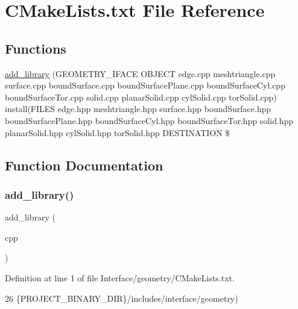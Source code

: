 \hypertarget{Interface_2geometry_2CMakeLists_8txt}{}\section{C\+Make\+Lists.\+txt File Reference}
\label{Interface_2geometry_2CMakeLists_8txt}
\subsection*{Functions}
\begin{DoxyCompactItemize}
\item 
\hyperlink{Interface_2geometry_2CMakeLists_8txt_a7893921b833d447c74d8d3f27995e8a1}{add\+\_\+library} (G\+E\+O\+M\+E\+T\+R\+Y\+\_\+\+I\+F\+A\+CE O\+B\+J\+E\+CT edge.\+cpp meshtriangle.\+cpp surface.\+cpp bound\+Surface.\+cpp bound\+Surface\+Plane.\+cpp bound\+Surface\+Cyl.\+cpp bound\+Surface\+Tor.\+cpp solid.\+cpp planar\+Solid.\+cpp cyl\+Solid.\+cpp tor\+Solid.\+cpp) install(F\+I\+L\+ES edge.\+hpp meshtriangle.\+hpp surface.\+hpp bound\+Surface.\+hpp bound\+Surface\+Plane.\+hpp bound\+Surface\+Cyl.\+hpp bound\+Surface\+Tor.\+hpp solid.\+hpp planar\+Solid.\+hpp cyl\+Solid.\+hpp tor\+Solid.\+hpp D\+E\+S\+T\+I\+N\+A\+T\+I\+ON \$
\end{DoxyCompactItemize}


\subsection{Function Documentation}
\mbox{\label{Interface_2geometry_2CMakeLists_8txt_a7893921b833d447c74d8d3f27995e8a1}} 
\subsubsection{\texorpdfstring{add\+\_\+library()}{add\_library()}}
{\footnotesize\ttfamily add\+\_\+library (\begin{DoxyParamCaption}\item[{G\+E\+O\+M\+E\+T\+R\+Y\+\_\+\+I\+F\+A\+CE O\+B\+J\+E\+CT edge.\+cpp meshtriangle.\+cpp surface.\+cpp bound\+Surface.\+cpp bound\+Surface\+Plane.\+cpp bound\+Surface\+Cyl.\+cpp bound\+Surface\+Tor.\+cpp solid.\+cpp planar\+Solid.\+cpp cyl\+Solid.\+cpp tor\+Solid.}]{cpp }\end{DoxyParamCaption})}



Definition at line 1 of file Interface/geometry/\+C\+Make\+Lists.\+txt.


\begin{DoxyCode}
26                \{PROJECT\_BINARY\_DIR\}/includes/interface/geometry)
\end{DoxyCode}

